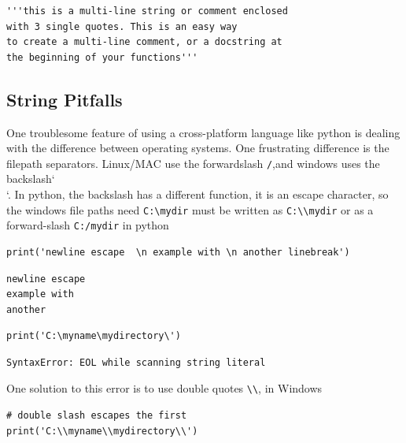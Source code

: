 \documentclass[%
oneside,                 %
final,                   %
10pt]{article}
\begin{document}
\begin{verbatim}
'''this is a multi-line string or comment enclosed
with 3 single quotes. This is an easy way
to create a multi-line comment, or a docstring at
the beginning of your functions'''
\end{verbatim}

\subsection{String Pitfalls}

One troublesome feature of using a cross-platform language like python is dealing with the difference between operating systems. One frustrating difference is the filepath separators. Linux/MAC use the forwardslash \texttt{/},and windows uses the backslash`\\`. In python, the backslash has a different function, it is an escape character, so the windows file paths need \Verb!C:\mydir! must be written as \Verb!C:\\mydir! or as a forward-slash \texttt{C:/mydir} in python

\begin{verbatim}
print('newline escape  \n example with \n another linebreak')
\end{verbatim}

\begin{verbatim}
newline escape
example with
another
\end{verbatim}

\begin{verbatim}
print('C:\myname\mydirectory\')
\end{verbatim}

\begin{verbatim}
SyntaxError: EOL while scanning string literal
\end{verbatim}

One solution to this error is to use double quotes \Verb!\\!, in Windows
\begin{verbatim}
# double slash escapes the first
print('C:\\myname\\mydirectory\\')
\end{verbatim}
\end{document}
